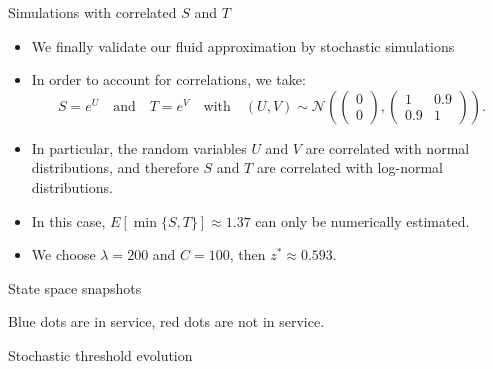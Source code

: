 \documentclass[aspectratio=169]{beamer}
\begin{document}
\begin{frame}{Simulations with correlated $S$ and $T$}
	\begin{itemize}
	\item We finally validate our fluid approximation by stochastic simulations
	\item In order to account for correlations, we take:
	 \begin{equation*}
    S = e^U \quad \text{and} \quad T = e^V \quad \text{with} \quad (U, V) \sim \mathcal{N}\left(\begin{pmatrix}
    0 \\ 0
    \end{pmatrix}, \begin{pmatrix}
    1 & 0.9 \\ 0.9 & 1
    \end{pmatrix}\right).
\end{equation*}
    \item In particular, the random variables $U$ and $V$ are correlated with normal distributions, and therefore $S$ and $T$ are correlated with log-normal distributions.
	\item In this case, $E[\min\{S,T\}] \approx 1.37$ can only be numerically estimated. 
	\item We choose $\lambda = 200$ and $C=100$, then $z^* \approx 0.593$.
	\end{itemize}
	

\end{frame}

\begin{frame}{State space snapshots}
    
	\begin{center}
	
    
    
    \end{center}

	\vfill
	Blue dots are in service, red dots are not in service. 
\end{frame}

\begin{frame}{Stochastic threshold evolution}
	\begin{center}
	
    
        
	\end{center}

\end{frame}
\end{document}
